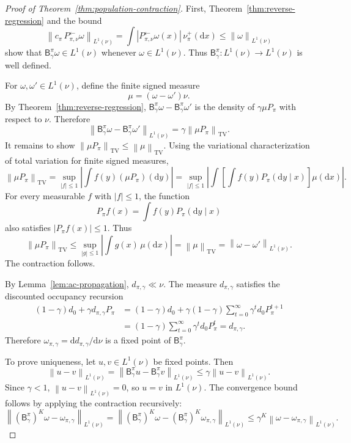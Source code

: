 \documentclass{article}
\newcommand{\1}{\mathbf{1}}
\newcommand{\dd}{\mathrm{d}}
\newcommand{\nup}{\nu_\pi^+}
\newcommand{\cpi}{c_\pi}
\newcommand{\omegastar}{\omega_{\pi,\gamma}}
\newcommand{\Bpig}{\mathsf{B}_\gamma^\pi}
\newcommand{\Pback}{P_{\pi,\nu}^{\leftarrow}}
\newcommand{\Mpi}{\Pback}
\newcommand{\Ppi}{P_\pi}
\newcommand{\dinit}{d_0}
\newcommand{\norm}[2][]{\left\lVert #2 \right\rVert_{#1}}
\newcommand{\LoneNu}[1]{\norm[L^1(\nu)]{#1}}
\newcommand{\abs}[1]{\left\lvert #1 \right\rvert}
\newcommand{\tvnorm}[1]{\left\lVert #1 \right\rVert_{\mathrm{TV}}}
\theoremstyle{plain}
\theoremstyle{definition}
\theoremstyle{remark}
\begin{document}
\begin{proof}[Proof of Theorem~\ref{thm:population-contraction}]
First, Theorem~\ref{thm:reverse-regression} and the bound
\[
    \LoneNu{\cpi\,\Mpi\omega}
    =
    \int \abs{\Mpi\omega(x)}\,\nup(\dd x)
    \leq
    \LoneNu{\omega}
\]
show that $\Bpig\omega\in L^1(\nu)$ whenever $\omega\in L^1(\nu)$.
Thus $\Bpig:L^1(\nu)\to L^1(\nu)$ is well defined.

For $\omega,\omega'\in L^1(\nu)$, define the finite signed measure
\[
    \mu=(\omega-\omega')\nu.
\]
By Theorem~\ref{thm:reverse-regression}, $\Bpig\omega-\Bpig\omega'$ is the density of $\gamma\mu\Ppi$ with respect to $\nu$.
Therefore
\[
    \LoneNu{\Bpig\omega-\Bpig\omega'}
    =
    \gamma\tvnorm{\mu\Ppi}.
\]
It remains to show $\tvnorm{\mu\Ppi}\leq\tvnorm{\mu}$.
Using the variational characterization of total variation for finite signed measures,
\[
    \tvnorm{\mu\Ppi}
    =
    \sup_{\abs{f}\leq 1}\abs{\int f(y)(\mu\Ppi)(\dd y)}
    =
    \sup_{\abs{f}\leq 1}\abs{\int \left[\int f(y)\Ppi(\dd y\mid x)\right]\mu(\dd x)}.
\]
For every measurable $f$ with $\abs{f}\leq 1$, the function
\[
    \Ppi f(x)=\int f(y)\Ppi(\dd y\mid x)
\]
also satisfies $\abs{\Ppi f(x)}\leq 1$.
Thus
\[
    \tvnorm{\mu\Ppi}
    \leq
    \sup_{\abs{g}\leq 1}\abs{\int g(x)\,\mu(\dd x)}
    =
    \tvnorm{\mu}
    =
    \LoneNu{\omega-\omega'}.
\]
The contraction follows.

By Lemma~\ref{lem:ac-propagation}, $d_{\pi,\gamma}\ll\nu$.
The measure $d_{\pi,\gamma}$ satisfies the discounted occupancy recursion
\[
\begin{aligned}
    (1-\gamma)\dinit+\gamma d_{\pi,\gamma}\Ppi
    &=
    (1-\gamma)\dinit
    +
    \gamma(1-\gamma)\sum_{t=0}^\infty \gamma^t\dinit\Ppi^{t+1}\\
    &=
    (1-\gamma)\sum_{t=0}^\infty \gamma^t\dinit\Ppi^t
    =
    d_{\pi,\gamma}.
\end{aligned}
\]
Therefore $\omegastar=\dd d_{\pi,\gamma}/\dd\nu$ is a fixed point of $\Bpig$.

To prove uniqueness, let $u,v\in L^1(\nu)$ be fixed points.
Then
\[
    \LoneNu{u-v}
    =
    \LoneNu{\Bpig u-\Bpig v}
    \leq
    \gamma\LoneNu{u-v}.
\]
Since $\gamma<1$, $\LoneNu{u-v}=0$, so $u=v$ in $L^1(\nu)$.
The convergence bound follows by applying the contraction recursively:
\[
    \LoneNu{(\Bpig)^K\omega-\omegastar}
    =
    \LoneNu{(\Bpig)^K\omega-(\Bpig)^K\omegastar}
    \leq
    \gamma^K\LoneNu{\omega-\omegastar}.
\]
\end{proof}
\end{document}
